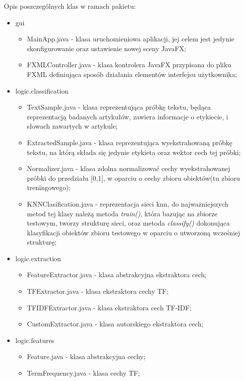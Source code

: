 \documentclass{classrep}
\begin{document}
Opis poszczególnych klas w ramach pakietu:

\begin{itemize}
	\item gui
	\begin{itemize}
		\item MainApp.java - klasa uruchomieniowa aplikacji, jej celem jest jedynie skonfigurowanie oraz ustawienie nowej sceny JavaFX;
		\item FXMLController.java - klasa kontrolera JavaFX przypisana do pliku FXML definiująca sposób działania elementów interfejsu użytkownika;
	\end{itemize}
	\item logic.classification
	\begin{itemize}
		\item TextSample.java - klasa reprezentująca próbkę tekstu, będąca reprezentacją badanych artykułów, zawiera informacje o etykiecie, i słowach zawartych w artykule;
		\item ExtractedSample.java - klasa reprezentująca wyekstrahowaną próbkę tekstu, na którą składa się jedynie etykieta oraz wektor cech tej próbki;
		\item Normalizer.java - klasa zdolna normalizować cechy wyekstrahowanej próbki do przedziału [0,1], w oparciu o cechy zbioru obiektów(tu zbioru treningowego);
		\item KNNClasification.java - reprezentacja sieci knn, do najważniejszych metod tej klasy należą metoda \textit{train()}, która bazując na zbiorze testowym, tworzy strukturę sieci, oraz metoda \textit{classify()} dokonująca klasyfikacji obiektów zbioru testowego w oparciu o utworzoną wcześniej strukturę;
	\end{itemize}
	\item logic.extraction
	\begin{itemize}
		\item FeatureExtractor.java - klasa abstrakcyjna ekstraktora cech;
		\item TFExtractor.java - klasa ekstraktora cechy TF;
		\item TFIDFExtractor.java - klasa ekstraktora cech TF-IDF;
		\item CustomExtractor.java - klasa autorskiego ekstraktora cech;
	\end{itemize}
	\item logic.features
	\begin{itemize}
		\item Feature.java - klasa abstrakcyjna cechy;
		\item TermFrequency.java - klasa cechy TF;

\end{itemize}
\end{itemize}
\end{document}
